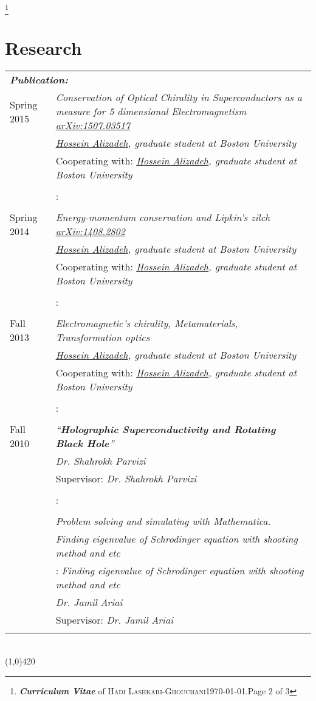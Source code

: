 \documentclass[10pt]{article}
\newcommand{\maxpages}{3}
\newcommand{\maxpages}{3}
\newcommand\HRule{\hspace*{.8cm}\line(1,0){420}\\}
\newenvironment{Record}[1]
{
    \vspace{-0.35cm}
    \section*{#1}
        \vspace{0.1cm}
        \begin{tabular}
}
{
        \end{tabular}\\
        \HRule
}
\newcommand{\FootNote}[1]{\let\thefootnote\relax\footnote{\textbf{\textit{Curriculum Vitae}} of \textsc{Hadi Lashkari-Ghouchani}\qquad\today.\qquad Page #1 of \maxpages}}
\begin{document}

\FootNote{2}


\newcommand{\Research}[7]{
    \multicolumn{2}{l}{\textbf{\textsl{ #1:}}}\\
    \quad#2&\textit{#3}\\
    \ifthenelse{\isempty{#4}}
    {&\textit{#5}\\}
    {&#4: \textit{#5}\\}
    \ifthenelse{\isempty{#6}}
    {&\textit{#7}\\}
    {&#6: \textit{#7}\\}%
}

\begin{Record}{Research}{l p{11cm}}
    \Research{Publication}
        {Spring 2015}
        {Conservation of Optical Chirality in Superconductors as a measure for 5 dimensional Electromagnetism \href{http://arxiv.org/abs/1507.03517}{arXiv:1507.03517}}
        {Cooperating with}
        {\href{http://physics.bu.edu/people/show/halizade}{Hossein Alizadeh}, graduate student at Boston University}
        {}{}%
    \Research{Publication}
        {Spring 2014}
        {Energy-momentum conservation and Lipkin’s zilch \href{http://arxiv.org/abs/1408.2802}{arXiv:1408.2802}}
        {Cooperating with}
        {\href{http://physics.bu.edu/people/show/halizade}{Hossein Alizadeh}, graduate student at Boston University}
        {}{}%
    \Research{Independent Research}
        {Fall 2013}
        {Electromagnetic's chirality, Metamaterials, Transformation optics}
        {Cooperating with}
        {\href{http://physics.bu.edu/people/show/halizade}{Hossein Alizadeh}, graduate student at Boston University}
        {}{}%
    \Research{M.Sc thesis}
        {Fall 2010}
        {``\textbf{Holographic Superconductivity and Rotating Black Hole}''}
        {Supervisor}
        {Dr. Shahrokh Parvizi}
        {}{}%
    \Research{B.Sc projects}
        {}
        {Problem solving and simulating with Mathematica.}
        {}
        {Finding eigenvalue of Schrodinger equation with shooting method and etc}
        {Supervisor}
        {Dr. Jamil Ariai}%

\end{Record}

\end{document}
